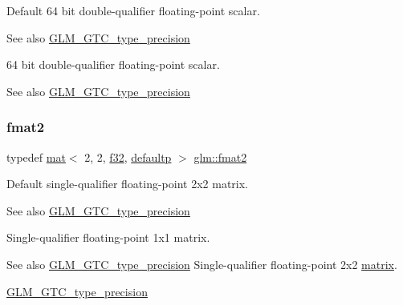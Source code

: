 Default 64 bit double-\/qualifier floating-\/point scalar. \begin{DoxySeeAlso}{See also}
\mbox{\hyperlink{group__gtc__type__precision}{G\+L\+M\+\_\+\+G\+T\+C\+\_\+type\+\_\+precision}}
\end{DoxySeeAlso}
64 bit double-\/qualifier floating-\/point scalar. \begin{DoxySeeAlso}{See also}
\mbox{\hyperlink{group__gtc__type__precision}{G\+L\+M\+\_\+\+G\+T\+C\+\_\+type\+\_\+precision}} 
\end{DoxySeeAlso}
\mbox{\label{group__gtc__type__precision_ga687a2fb53c536086879726d0c0f88a8b}} 
\subsubsection{\texorpdfstring{fmat2}{fmat2}}
{\footnotesize\ttfamily typedef \mbox{\hyperlink{structglm_1_1mat}{mat}}$<$ 2, 2, \mbox{\hyperlink{group__gtc__type__precision_ga0ec999b57f5330d9021256e96038df04}{f32}}, \mbox{\hyperlink{namespaceglm_a36ed105b07c7746804d7fdc7cc90ff25a9d21ccd8b5a009ec7eb7677befc3bf51}{defaultp}} $>$ \mbox{\hyperlink{group__gtc__type__precision_ga687a2fb53c536086879726d0c0f88a8b}{glm\+::fmat2}}}

Default single-\/qualifier floating-\/point 2x2 matrix. \begin{DoxySeeAlso}{See also}
\mbox{\hyperlink{group__gtc__type__precision}{G\+L\+M\+\_\+\+G\+T\+C\+\_\+type\+\_\+precision}}
\end{DoxySeeAlso}
Single-\/qualifier floating-\/point 1x1 matrix. \begin{DoxySeeAlso}{See also}
\mbox{\hyperlink{group__gtc__type__precision}{G\+L\+M\+\_\+\+G\+T\+C\+\_\+type\+\_\+precision}} Single-\/qualifier floating-\/point 2x2 \mbox{\hyperlink{_s_d_l__opengl__glext_8h_a7b24a3f2f56eb1244ae69dacb4fecb6f}{matrix}}. 

\mbox{\hyperlink{group__gtc__type__precision}{G\+L\+M\+\_\+\+G\+T\+C\+\_\+type\+\_\+precision}} 
\end{DoxySeeAlso}
\mbox{\label{group__gtc__type__precision_gad3b3ab6399b8b960e8994b37521bab86}} 

